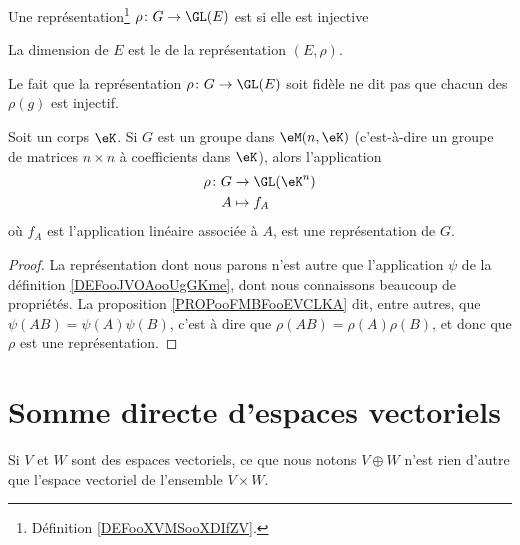 \begin{definition}
	Une représentation\footnote{Définition \ref{DEFooXVMSooXDIfZV}.} \( \rho\colon G\to \GL(E)\) est  si elle est injective

	La dimension de \( E\) est le  de la représentation \( (E,\rho)\).
\end{definition}

Le fait que la représentation \( \rho\colon G \to \GL(E)\) soit fidèle ne dit pas que chacun des \( \rho(g)\) est injectif.

\begin{proposition}     \label{PROPooHNQOooSzeEFG}
	Soit un corps \( \eK\). Si \( G\) est un groupe dans \( \eM(n,\eK)\) (c'est-à-dire un groupe de matrices \( n\times n\) à coefficients dans \( \eK\)), alors l'application
	\begin{equation}
		\begin{aligned}
			\rho\colon G & \to \GL(\eK^n) \\
			A            & \mapsto f_A
		\end{aligned}
	\end{equation}
	où \( f_A\) est l'application linéaire associée à \( A\), est une représentation de \( G\).
\end{proposition}

\begin{proof}
	La représentation dont nous parons n'est autre que l'application \( \psi\) de la définition \ref{DEFooJVOAooUgGKme}, dont nous connaissons beaucoup de propriétés. La proposition \ref{PROPooFMBFooEVCLKA} dit, entre autres, que \( \psi(AB)=\psi(A)\psi(B)\), c'est à dire que \( \rho(AB)=\rho(A)\rho(B)\), et donc que \( \rho\) est une représentation.
\end{proof}


\section{Somme directe d'espaces vectoriels}

Si \( V\) et \( W\) sont des espaces vectoriels, ce que nous notons \( V\oplus W\) n'est rien d'autre que l'espace vectoriel de l'ensemble \( V\times W\).

